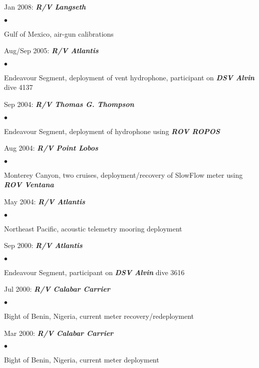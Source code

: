 \documentclass[11pt]{res}
\newenvironment{list2}{
  \begin{list}{$\bullet$}{%
      \setlength{\itemsep}{0in}
      \setlength{\parsep}{0in} \setlength{\parskip}{0in}
      \setlength{\topsep}{0in} \setlength{\partopsep}{0in} 
      \setlength{\leftmargin}{0.2in}}}{\end{list}}
\begin{document}
\begin{resume}
\vspace*{-.1in}
Jan 2008: {\bf\em R/V Langseth}
\begin{list2}
\item Gulf of Mexico, air-gun calibrations
\end{list2}

\vspace*{-.1in}
Aug/Sep 2005: {\bf\em R/V Atlantis}
\begin{list2}
\item Endeavour Segment, deployment of vent hydrophone, participant on {\bf\em DSV Alvin} dive 4137
\end{list2}

\vspace*{-.1in}
Sep 2004: {\bf\em R/V Thomas G. Thompson}
\begin{list2}
\item Endeavour Segment, deployment of hydrophone using {\bf\em ROV ROPOS}
\end{list2}

\vspace*{-.1in}
Aug 2004: {\bf\em R/V Point Lobos}
\begin{list2}
\item Monterey Canyon, two cruises, deployment/recovery of SlowFlow meter using {\bf\em ROV Ventana}
\end{list2}

\vspace*{-.1in}
May 2004: {\bf\em R/V Atlantis}
\begin{list2}
\item Northeast Pacific, acoustic telemetry mooring deployment
\end{list2}

\vspace*{-.1in}
Sep 2000: {\bf\em R/V Atlantis}
\begin{list2}
\item Endeavour Segment, participant on {\bf\em DSV Alvin} dive 3616
\end{list2}

\vspace*{-.1in}
Jul 2000: {\bf\em R/V Calabar Carrier}
\begin{list2}
\item Bight of Benin, Nigeria, current meter recovery/redeployment
\end{list2}

\vspace*{-.1in}
Mar 2000: {\bf\em R/V Calabar Carrier}
\begin{list2}
\item Bight of Benin, Nigeria, current meter deployment
\end{list2}


\end{resume}
\end{document}

